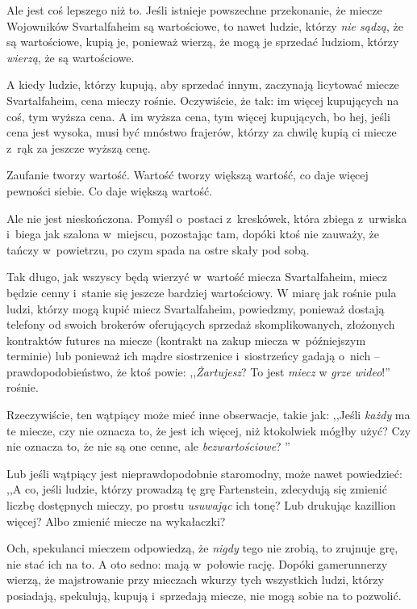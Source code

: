 \documentclass[oneside,polish,11pt,rmheadings]{mwbk}
\begin{document}
Ale jest coś lepszego niż to. Jeśli istnieje powszechne przekonanie, że miecze Wojowników Svartalfaheim są wartościowe, to nawet ludzie, którzy \textit{nie sądzą}, że są wartościowe, kupią je, ponieważ wierzą, że mogą je sprzedać ludziom, którzy \textit{wierzą}, że są wartościowe.

A kiedy ludzie, którzy kupują, aby sprzedać innym, zaczynają licytować miecze Svartalfaheim, cena mieczy rośnie. Oczywiście, że tak: im więcej kupujących na coś, tym wyższa cena. A im wyższa cena, tym więcej kupujących, bo hej, jeśli cena jest wysoka, musi być mnóstwo frajerów, którzy za chwilę kupią ci miecze z~rąk za jeszcze wyższą cenę.

Zaufanie tworzy wartość. Wartość tworzy większą wartość, co daje więcej pewności siebie. Co daje większą wartość.

Ale nie jest nieskończona. Pomyśl o~postaci z~kreskówek, która zbiega z~urwiska i~biega jak szalona w~miejscu, pozostając tam, dopóki ktoś nie zauważy, że tańczy w~powietrzu, po czym spada na ostre skały pod sobą.

Tak długo, jak wszyscy będą wierzyć w~wartość miecza Svartalfaheim, miecz będzie cenny i~stanie się jeszcze bardziej wartościowy. W miarę jak rośnie pula ludzi, którzy mogą kupić miecz Svartalfaheim, powiedzmy, ponieważ dostają telefony od swoich brokerów oferujących sprzedaż skomplikowanych, złożonych kontraktów futures na miecze (kontrakt na zakup miecza w~późniejszym terminie) lub ponieważ ich mądre siostrzenice i~siostrzeńcy gadają o~nich -- prawdopodobieństwo, że ktoś powie: ,,\textit{Żartujesz}? To jest \textit{miecz }w \textit{grze wideo}!'' rośnie.

Rzeczywiście, ten wątpiący może mieć inne obserwacje, takie jak: ,,Jeśli \textit{każdy }ma te miecze, czy nie oznacza to, że jest ich więcej, niż ktokolwiek mógłby użyć? Czy nie oznacza to, że nie są one cenne, ale \textit{bezwartościowe}? ''

Lub jeśli wątpiący jest nieprawdopodobnie staromodny, może nawet powiedzieć: ,,A co, jeśli ludzie, którzy prowadzą tę grę Fartenstein, zdecydują się zmienić liczbę dostępnych mieczy, po prostu \textit{usuwając }ich tonę? Lub drukując kazillion więcej? Albo zmienić miecze na wykałaczki?

Och, spekulanci mieczem odpowiedzą, że \textit{nigdy }tego nie zrobią, to zrujnuje grę, nie stać ich na to. A oto sedno: mają w~połowie rację. Dopóki gamerunnerzy wierzą, że majstrowanie przy mieczach wkurzy tych wszystkich ludzi, którzy posiadają, spekulują, kupują i~sprzedają miecze, nie mogą sobie na to pozwolić.
\end{document}
